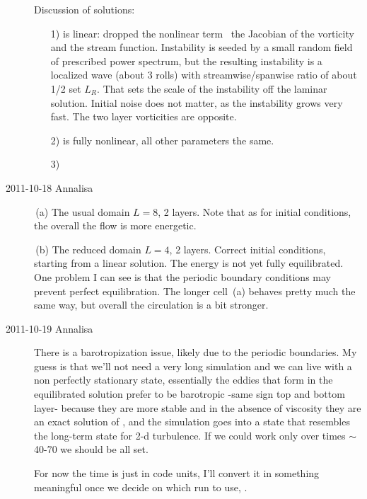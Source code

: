 \begin{description}
Discussion of solutions:
\begin{enumerate}
  \item [1)]
is linear: dropped the nonlinear term \ie\ the Jacobian of the vorticity
and the stream function. Instability is seeded by a small random field of
prescribed power spectrum, but the resulting instability is a localized
wave (about 3 rolls) with streamwise/spanwise ratio of about 1/2 set
$L_R$. That sets the scale of the instability off the laminar solution.
Initial noise does not matter, as the instability grows very fast. The
two layer vorticities are opposite.

  \item [2)] is fully nonlinear, all other parameters the same.

  \item [3)]
\end{enumerate}

\item[2011-10-18 Annalisa]

\,(a)
The usual domain $L=8$, 2 layers. Note that as for initial conditions,
the overall the flow is more energetic.

\,(b)
The reduced domain $L=4$, 2 layers. Correct initial conditions, starting
from a linear solution. The energy is not yet fully equilibrated. One
problem I can see is that the periodic boundary conditions may prevent
perfect equilibration. The longer cell \,(a) behaves
pretty much the same way, but overall the circulation is a bit stronger.

\item[2011-10-19 Annalisa]
There is a barotropization issue, likely due to the periodic boundaries.
My guess is that we'll not need a very long simulation and we can live
with a non perfectly stationary state, essentially the eddies that form
in the equilibrated solution prefer to be barotropic -same sign top and
bottom layer- because they are more stable and in the absence of
viscosity they are an exact solution of \NS, and the simulation goes
into a state that resembles the long-term state for 2-d turbulence. If we
could work only over times $\sim $40-70 we should be all set.

For now the time is just in code units, I'll convert it in something
meaningful once we decide on which run to use, \etc.


\end{description}
